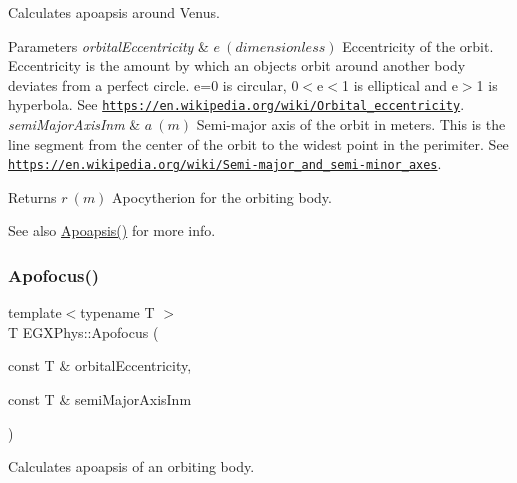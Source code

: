 Calculates apoapsis around Venus. 


\begin{DoxyParams}{Parameters}
{\em orbital\+Eccentricity} & $ e\ (dimensionless)$ Eccentricity of the orbit. Eccentricity is the amount by which an objects orbit around another body deviates from a perfect circle. e=0 is circular, 0$<$e$<$1 is elliptical and e$>$1 is hyperbola. See \href{https://en.wikipedia.org/wiki/Orbital_eccentricity}{\tt https\+://en.\+wikipedia.\+org/wiki/\+Orbital\+\_\+eccentricity}. \\
\hline
{\em semi\+Major\+Axis\+Inm} & $ a\ (m)$ Semi-\/major axis of the orbit in meters. This is the line segment from the center of the orbit to the widest point in the perimiter. See \href{https://en.wikipedia.org/wiki/Semi-major_and_semi-minor_axes}{\tt https\+://en.\+wikipedia.\+org/wiki/\+Semi-\/major\+\_\+and\+\_\+semi-\/minor\+\_\+axes}. \\
\hline
\end{DoxyParams}
\begin{DoxyReturn}{Returns}
$ r\ (m)$ Apocytherion for the orbiting body. 
\end{DoxyReturn}
\begin{DoxySeeAlso}{See also}
\mbox{\hyperlink{group___e_g_x_phys-_apoapsis_gafd08a2d1d64886e7bb9bcb7ff65bc3ea}{Apoapsis()}} for more info. 
\end{DoxySeeAlso}
\mbox{\label{group___e_g_x_phys-_apoapsis_gada28ef9258703e9e32ac9e564544ae87}} 
\subsubsection{\texorpdfstring{Apofocus()}{Apofocus()}}
{\footnotesize\ttfamily template$<$typename T $>$ \\
T E\+G\+X\+Phys\+::\+Apofocus (\begin{DoxyParamCaption}\item[{const T \&}]{orbital\+Eccentricity,  }\item[{const T \&}]{semi\+Major\+Axis\+Inm }\end{DoxyParamCaption})}



Calculates apoapsis of an orbiting body. 


